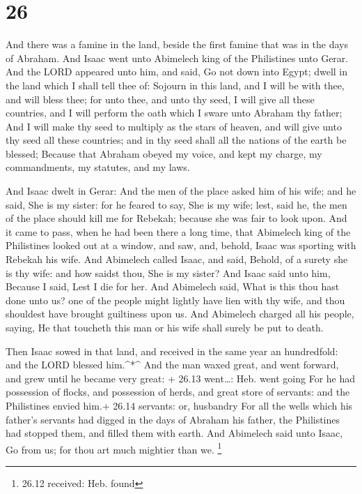 \hypertarget{section-25}{%
\section{26}\label{section-25}}

 And there was a famine in the land, beside the first famine
that was in the days of Abraham. And Isaac went unto Abimelech king of
the Philistines unto Gerar.  And the LORD appeared unto him,
and said, Go not down into Egypt; dwell in the land which I shall tell
thee of:  Sojourn in this land, and I will be with thee, and
will bless thee; for unto thee, and unto thy seed, I will give all these
countries, and I will perform the oath which I sware unto Abraham thy
father;  And I will make thy seed to multiply as the stars
of heaven, and will give unto thy seed all these countries; and in thy
seed shall all the nations of the earth be blessed;  Because
that Abraham obeyed my voice, and kept my charge, my commandments, my
statutes, and my laws.

 And Isaac dwelt in Gerar:  And the men of the
place asked him of his wife; and he said, She is my sister: for he
feared to say, She is my wife; lest, said he, the men of the place
should kill me for Rebekah; because she was fair to look upon.
 And it came to pass, when he had been there a long time,
that Abimelech king of the Philistines looked out at a window, and saw,
and, behold, Isaac was sporting with Rebekah his wife.  And
Abimelech called Isaac, and said, Behold, of a surety she is thy wife:
and how saidst thou, She is my sister? And Isaac said unto him, Because
I said, Lest I die for her.  And Abimelech said, What is
this thou hast done unto us? one of the people might lightly have lien
with thy wife, and thou shouldest have brought guiltiness upon us.
 And Abimelech charged all his people, saying, He that
toucheth this man or his wife shall surely be put to death.

 Then Isaac sowed in that land, and received in the same
year an hundredfold: and the LORD blessed him.\^{}*\^{} 
And the man waxed great, and went forward, and grew until he became very
great: + 26.13 went\ldots: Heb. went going  For he had
possession of flocks, and possession of herds, and great store of
servants: and the Philistines envied him.+ 26.14 servants: or, husbandry
 For all the wells which his father's servants had digged
in the days of Abraham his father, the Philistines had stopped them, and
filled them with earth.  And Abimelech said unto Isaac, Go
from us; for thou art much mightier than we. \footnote{26.12 received:
  Heb. found}

